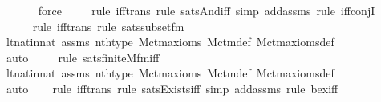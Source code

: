 \begin{isabellebody}
\ \ \ \ \ \isamarkupfalse%
\ force\isanewline
\ \ \ \ \isamarkupfalse%
{\isacharparenleft}{\kern0pt}rule\ iff{\isacharunderscore}{\kern0pt}trans{\isacharcomma}{\kern0pt}\ rule\ sats{\isacharunderscore}{\kern0pt}And{\isacharunderscore}{\kern0pt}iff{\isacharcomma}{\kern0pt}\ simp\ add{\isacharcolon}{\kern0pt}assms{\isacharcomma}{\kern0pt}\ rule\ iff{\isacharunderscore}{\kern0pt}conjI{}{\isacharparenright}{\kern0pt}\isanewline
\ \ \ \ \ \isamarkupfalse%
{\isacharparenleft}{\kern0pt}rule\ iff{\isacharunderscore}{\kern0pt}trans{\isacharcomma}{\kern0pt}\ rule\ sats{\isacharunderscore}{\kern0pt}subset{\isacharunderscore}{\kern0pt}fm{\isacharparenright}{\kern0pt}\isanewline
\ \ \isamarkupfalse%
\ lt{\isacharunderscore}{\kern0pt}nat{\isacharunderscore}{\kern0pt}in{\isacharunderscore}{\kern0pt}nat\ assms\ nth{\isacharunderscore}{\kern0pt}type\ M{\isacharunderscore}{\kern0pt}ctm{\isacharunderscore}{\kern0pt}axioms\ M{\isacharunderscore}{\kern0pt}ctm{\isacharunderscore}{\kern0pt}def\ M{\isacharunderscore}{\kern0pt}ctm{\isacharunderscore}{\kern0pt}axioms{\isacharunderscore}{\kern0pt}def\isanewline
\ \ \ \ \ \ \ \ \ \isamarkupfalse%
\ auto{\isacharbrackleft}{\kern0pt}{}{\isacharbrackright}{\kern0pt}\isanewline
\ \ \ \ \isamarkupfalse%
{\isacharparenleft}{\kern0pt}rule\ sats{\isacharunderscore}{\kern0pt}finite{\isacharunderscore}{\kern0pt}M{\isacharunderscore}{\kern0pt}fm{\isacharunderscore}{\kern0pt}iff{\isacharparenright}{\kern0pt}\isanewline
\ \ \isamarkupfalse%
\ lt{\isacharunderscore}{\kern0pt}nat{\isacharunderscore}{\kern0pt}in{\isacharunderscore}{\kern0pt}nat\ assms\ nth{\isacharunderscore}{\kern0pt}type\ M{\isacharunderscore}{\kern0pt}ctm{\isacharunderscore}{\kern0pt}axioms\ M{\isacharunderscore}{\kern0pt}ctm{\isacharunderscore}{\kern0pt}def\ M{\isacharunderscore}{\kern0pt}ctm{\isacharunderscore}{\kern0pt}axioms{\isacharunderscore}{\kern0pt}def\isanewline
\ \ \ \ \ \ \ \ \isamarkupfalse%
\ auto{\isacharbrackleft}{\kern0pt}{}{\isacharbrackright}{\kern0pt}\isanewline
\ \ \ \isamarkupfalse%
{\isacharparenleft}{\kern0pt}rule\ iff{\isacharunderscore}{\kern0pt}trans{\isacharcomma}{\kern0pt}\ rule\ sats{\isacharunderscore}{\kern0pt}Exists{\isacharunderscore}{\kern0pt}iff{\isacharcomma}{\kern0pt}\ simp\ add{\isacharcolon}{\kern0pt}assms{\isacharcomma}{\kern0pt}\ rule\ bex{\isacharunderscore}{\kern0pt}iff{\isacharparenright}{\kern0pt}\isanewline
\ \ \ \isamarkupfalse%

\end{isabellebody}
